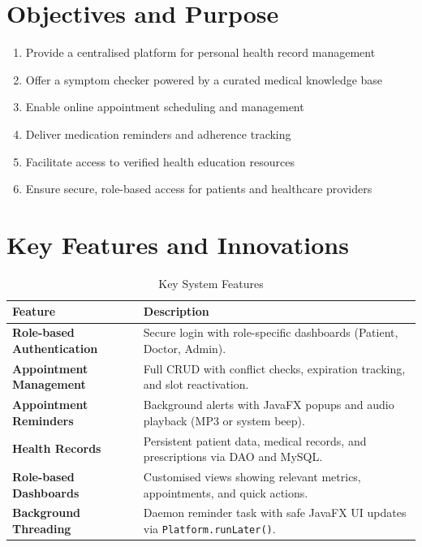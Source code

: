 \documentclass[12pt,a4paper]{report}
\newcommand{\rowE}{\rowcolor{White}}
\newcommand{\rowO}{\rowcolor{LightGray!60}}
\begin{document}
\section{Objectives and Purpose}

\begin{tcolorbox}[successbox, title={Core Objectives}]
\begin{enumerate}[leftmargin=1.2cm]
  \item Provide a centralised platform for personal health record management
  \item Offer a symptom checker powered by a curated medical knowledge base
  \item Enable online appointment scheduling and management
  \item Deliver medication reminders and adherence tracking
  \item Facilitate access to verified health education resources
  \item Ensure secure, role-based access for patients and healthcare providers
\end{enumerate}
\end{tcolorbox}

\section{Key Features and Innovations}

\begin{table}[H]
\centering
\caption{Key System Features}
\begin{tabularx}{\textwidth}{>{\bfseries\color{PrimaryBlue}}l X}
\toprule
\rowcolor{PrimaryBlue!15}
\textbf{Feature} & \textbf{Description} \\
\midrule
\rowO Role-based Authentication & Secure login with role-specific dashboards (Patient, Doctor, Admin). \\
\rowE Appointment Management & Full CRUD with conflict checks, expiration tracking, and slot reactivation. \\
\rowO Appointment Reminders & Background alerts with JavaFX popups and audio playback (MP3 or system beep). \\
\rowE Health Records & Persistent patient data, medical records, and prescriptions via DAO and MySQL. \\
\rowO Role-based Dashboards & Customised views showing relevant metrics, appointments, and quick actions. \\
\rowE Background Threading & Daemon reminder task with safe JavaFX UI updates via \texttt{Platform.runLater()}. \\\bottomrule
\end{tabularx}
\end{table}
\end{document}
